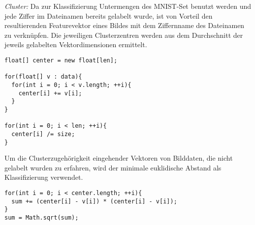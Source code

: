 \textit{Cluster:}
Da zur Klassifizierung Untermengen des MNIST-Set benutzt werden und jede Ziffer im Dateinamen bereits gelabelt wurde, ist von Vorteil den resultierenden Featurevektor eines Bildes mit dem Ziffernname des Dateinamen zu verknüpfen.
Die jeweiligen Clusterzentren werden aus dem Durchschnitt der jeweils gelabelten Vektordimensionen ermittelt.
\begin{lstlisting}
float[] center = new float[len];
        
for(float[] v : data){
  for(int i = 0; i < v.length; ++i){
    center[i] += v[i];
  }
}
        
for(int i = 0; i < len; ++i){
  center[i] /= size;
}
\end{lstlisting}
Um die Clusterzugehörigkeit eingehender Vektoren von Bilddaten, die nicht gelabelt wurden zu erfahren, wird der minimale euklidische Abstand als Klassifizierung verwendet.
\begin{lstlisting}
for(int i = 0; i < center.length; ++i){
  sum += (center[i] - v[i]) * (center[i] - v[i]);
}
sum = Math.sqrt(sum);
\end{lstlisting}